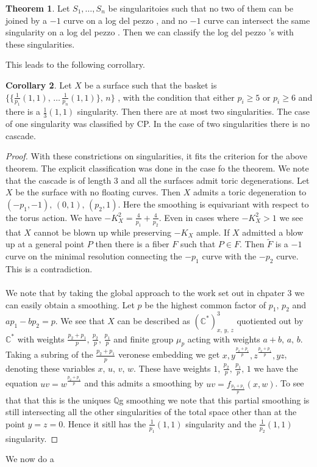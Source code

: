 \documentclass[11pt]{report}
\theoremstyle{definition}
\newtheorem{thm}{Theorem}[section]
\theoremstyle{definition}
\newtheorem{cor}[thm]{Corollary}
\theoremstyle{definition}
\theoremstyle{definition}
\theoremstyle{definition}
\theoremstyle{definition}
\theoremstyle{definition}
\theoremstyle{definition}
\newcommand{\C}[1]{(\mathbb{C}^*)^#1}
\newcommand{\ldp}{log del pezzo }
\newcommand{\mb}[1]{\mathbb{#1}}
\begin{document}
\begin{thm}
Let $S_1, \dots , S_n$ be singularitoies such that no two of them can be joined by a $-1$ curve on a \ldp , and no $-1$ curve can intersect the same singularity on a \ldp. Then we can classify the \ldp's with these singularities.
\end{thm}
 This leads to the following corrollary.
\begin{cor}
Let $X$ be a surface such that the basket is  $\{ \{ \frac{1}{p_1}(1,1), \, \dots \, \frac{1}{p_n}(1,1) \}, \, n \}$ , with the condition that either $p_i \geq 5$ or $p_i \geq 6$ and there is a $\frac{1}{3}(1,1)$ singularity. Then there are at most two singularities. The case of one singularity was classified by CP. In the case of two singularities there is no cascade. 
\end{cor}
\begin{proof}
With these constrictions on singularities, it fits the criterion for the above theorem. The explicit classification was done in the case fo the theorem. We note that the cascade is of length 3 and all the surfaces admit toric degenerations. Let $X$ be the surface with no floating curves. Then $X$ admits a toric degeneration to $(-p_1, -1), \, (0, 1), \, (p_2, 1)$. Here the smoothing is equivariant with respect to the torus action. We have $-K_X^2 = \frac{4}{p_1} + \frac{4}{p_2}$. Even in cases where $-K_X^2 > 1$ we see that $X$ cannot be blown up while preserving $-K_X$ ample. If $X$ admitted a blow up at a general point $P$ then there is a fiber $F$ such that $P \in F$. Then $\widetilde F$ is a $-1$ curve on the minimal resolution connecting the $-p_1$ curve with the $-p_2$ curve. This is a contradiction.
\\
\\
We note that by taking the global approach to the work set out in chpater 3 we can easily obtain a smoothing. Let $p$ be the highest common factor of $p_1, \, p_2$ and $ap_1 - bp_2 = p$. We see that $X$ can be described as $\C{3}_{x, \,y, \, z}$ quotiented out by $\mb{C}^*$ with weights $\frac{p_2 + p_1}{p}, \, \frac{p_2}{p}, \, \frac{p_1}{p}$ and finite group $\mu_p$ acting with weights $a+b, \, a, \, b $. Taking a subring of the $\frac{p_2 + p_1}{p}$ veronese embedding we get $x, y^\frac{p_2 + p_1}{p}, z ^\frac{p_2 + p_1}{p}, yz$, denoting these variables $x, \, u, \, v, \, w$. These have weights $1, \, \frac{p_2}{p}, \, \frac{p_1}{p}, \, 1$ we have the equation $uv = w^\frac{p_2 + p_1}{p}$ and this admits a smoothing by $uv = f_\frac{p_2 + p_1}{p} ( x,w)$. To see that that this is the uniques $\mb{Q}$g smoothing we note that this partial smoothing is still intersecting all the other singularities of the total space other than at the point $y = z = 0$. Hence it sitll has the $\frac{1}{p_1}(1,1)$ singularity and the $\frac{1}{p_2}(1,1)$ singularity.
\end{proof}
We now do a
\end{document}
